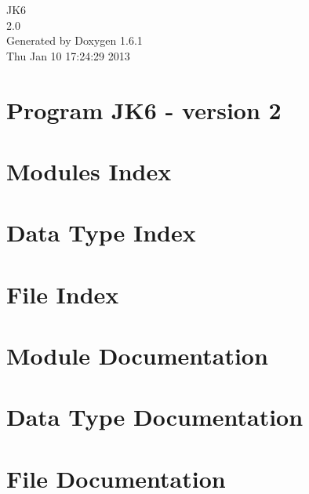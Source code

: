 \documentclass[a4paper]{book}
\begin{document}
\hypersetup{pageanchor=false}
\begin{titlepage}
\vspace*{7cm}
\begin{center}
{\Large JK6 \\[1ex]\large 2.0 }\\
\vspace*{1cm}
{\large Generated by Doxygen 1.6.1}\\
\vspace*{0.5cm}
{\small Thu Jan 10 17:24:29 2013}\\
\end{center}
\end{titlepage}
\clearemptydoublepage
{}
\tableofcontents
\clearemptydoublepage
{}
\hypersetup{pageanchor=true}
\chapter{Program JK6 -\/ version 2}
\label{index}\hypertarget{index}{}
\chapter{Modules Index}

\chapter{Data Type Index}

\chapter{File Index}

\chapter{Module Documentation}





\chapter{Data Type Documentation}


\chapter{File Documentation}






\printindex
\end{document}
